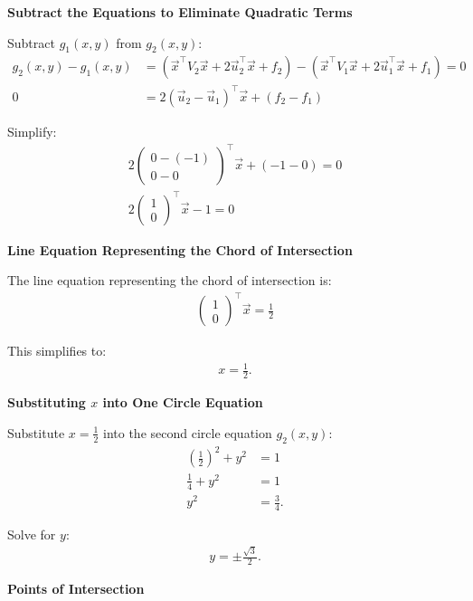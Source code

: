 \documentclass[journal]{IEEEtran}
\begin{document}
\textbf{ Subtract the Equations to Eliminate Quadratic Terms}

Subtract \( g_1(x, y) \) from \( g_2(x, y) \):
\begin{align}
    g_2(x, y) - g_1(x, y) &= (\vec{x}^\top V_2 \vec{x} + 2 \vec{u}_2^\top \vec{x} + f_2) - (\vec{x}^\top V_1 \vec{x} + 2 \vec{u}_1^\top \vec{x} + f_1) = 0 \\
    0 &= 2 (\vec{u}_2 - \vec{u}_1)^\top \vec{x} + (f_2 - f_1)
\end{align}

Simplify:
\begin{align}
    2 \begin{pmatrix} 0 - (-1) \\ 0 - 0 \end{pmatrix}^\top \vec{x} + (-1 - 0) = 0 \\
    2 \begin{pmatrix} 1 \\ 0 \end{pmatrix}^\top \vec{x} - 1 = 0
\end{align}

\textbf{ Line Equation Representing the Chord of Intersection}

The line equation representing the chord of intersection is:
\begin{align}
    \begin{pmatrix} 1 \\ 0 \end{pmatrix}^\top \vec{x} = \frac{1}{2}
\end{align}

This simplifies to:
\begin{align}
    x = \frac{1}{2}.
\end{align}

\textbf{ Substituting \( x \) into One Circle Equation}

Substitute \( x = \frac{1}{2} \) into the second circle equation \( g_2(x, y) \):
\begin{align}
    \left( \frac{1}{2} \right)^2 + y^2 &= 1 \\
    \frac{1}{4} + y^2 &= 1 \\
    y^2 &= \frac{3}{4}.
\end{align}

Solve for \( y \):
\begin{align}
    y = \pm \frac{\sqrt{3}}{2}.
\end{align}

\textbf{ Points of Intersection}
\end{document}
